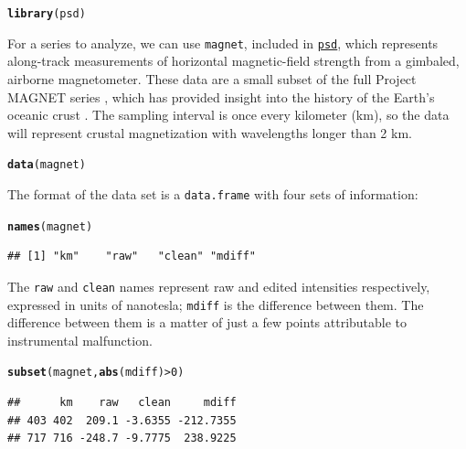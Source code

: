 \documentclass[10pt]{article}\usepackage[]{graphicx}\usepackage[]{color}
\makeatletter
\newcommand{\hlnum}[1]{\textcolor[rgb]{0.686,0.059,0.569}{#1}}%
\newcommand{\hlopt}[1]{\textcolor[rgb]{0,0,0}{#1}}%
\newcommand{\hlstd}[1]{\textcolor[rgb]{0.345,0.345,0.345}{#1}}%
\newcommand{\hlkwd}[1]{\textcolor[rgb]{0.737,0.353,0.396}{\textbf{#1}}}%
\newenvironment{kframe}{%
 \def\at@end@of@kframe{}%
 \ifinner\ifhmode%
  \def\at@end@of@kframe{\end{minipage}}%
  \begin{minipage}{\columnwidth}%
 \fi\fi%
 \def\FrameCommand##1{\hskip\@totalleftmargin \hskip-\fboxsep
 \colorbox{shadecolor}{##1}\hskip-\fboxsep
     \hskip-\linewidth \hskip-\@totalleftmargin \hskip\columnwidth}%
 \MakeFramed {\advance\hsize-\width
   \@totalleftmargin\z@ \linewidth\hsize
   \@setminipage}}%
 {\par\unskip\endMakeFramed%
 \at@end@of@kframe}
\newenvironment{knitrout}{}{} %
\newcommand{\Rcmd}[1]{\texttt{#1}}
\newcommand{\psd}[0]{\href{http://abarbour.github.com/psd/}{\color{blue}\Rcmd{psd}}}
\makeatother
\begin{document}
\begin{knitrout}
\color{fgcolor}\begin{kframe}
\begin{alltt}
\hlkwd{library}\hlstd{(psd)}
\end{alltt}


{\ttfamily\noindent\itshape\color{messagecolor}{\#\# Loading required package: fftw\\\#\# Loaded psd (0.5.0) -- Adaptive multitaper spectrum estimation}}\end{kframe}
\end{knitrout}
For a series to analyze, we can use \Rcmd{magnet}, included in \psd{},
which represents along-track measurements
of horizontal magnetic-field strength from a gimbaled, airborne magnetometer.
These data are a small subset of the full Project MAGNET series \citep{coleman1992},
which has provided insight into
the history of the Earth's oceanic crust 
\citep{parker1997, obrien1999, korte2002}.
The sampling interval is
once every kilometer (km), so the data will represent
crustal magnetization with wavelengths longer than 2 km.
\begin{knitrout}
\color{fgcolor}\begin{kframe}
\begin{alltt}
\hlkwd{data}\hlstd{(magnet)}
\end{alltt}
\end{kframe}
\end{knitrout}
The format of the data set is a \Rcmd{data.frame} with four
sets of information:
\begin{knitrout}
\color{fgcolor}\begin{kframe}
\begin{alltt}
\hlkwd{names}\hlstd{(magnet)}
\end{alltt}
\begin{verbatim}
## [1] "km"    "raw"   "clean" "mdiff"
\end{verbatim}
\end{kframe}
\end{knitrout}
The \Rcmd{raw} and \Rcmd{clean} names represent raw
and edited intensities respectively, expressed in units of nanotesla; 
\Rcmd{mdiff} is the difference between them.
The difference between them is a matter of just a few points
attributable to instrumental malfunction. 
\begin{knitrout}
\color{fgcolor}\begin{kframe}
\begin{alltt}
\hlkwd{subset}\hlstd{(magnet,} \hlkwd{abs}\hlstd{(mdiff)}\hlopt{>}\hlnum{0}\hlstd{)}
\end{alltt}
\begin{verbatim}
##      km    raw   clean     mdiff
## 403 402  209.1 -3.6355 -212.7355
## 717 716 -248.7 -9.7775  238.9225
\end{verbatim}
\end{kframe}
\end{knitrout}
\end{document}
